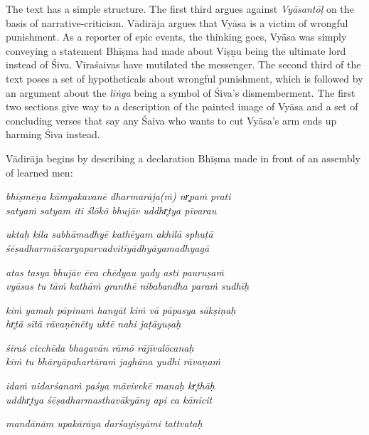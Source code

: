The text has a simple structure. The first third argues against \emph{Vyāsantōḷ} on the basis of narrative-criticism. Vādirāja argues that Vyāsa is a victim of wrongful punishment. As a reporter of epic events, the thinking goes, Vyāsa was simply conveying a statement Bhīṣma had made about Viṣṇu being the ultimate lord instead of Śiva. Vīraśaivas have mutilated the messenger. The second third of the text poses a set of hypotheticals about wrongful punishment, which is followed by an argument about the \emph{liṅga} being a symbol of Śiva’s dismemberment. The first two sections give way to a description of the painted image of Vyāsa and a set of concluding verses that say any Śaiva who wants to cut Vyāsa’s arm ends up harming Śiva instead.


Vādirāja begins by describing a declaration Bhīṣma made in front of an assembly of learned men:

\begin{pullquote}\raggedright
      \emph{bhīṣmēṇa kāmyakavanē dharmarāja(ṁ) nr̥paṁ prati}\\
\emph{satyaṁ satyam iti ślōkō bhujāv uddhr̥tya pīvarau}

\emph{uktaḥ kila sabhāmadhyē kathēyam akhilā sphuṭā}\\
\emph{śēṣadharmāścaryaparvadvitīyādhyāyamadhyagā}

\emph{atas tasya bhujāv ēva chēdyau yady asti pauruṣaṁ}\\
\emph{vyāsas tu tāṁ kathāṁ granthē nibabandha paraṁ sudhīḥ}

\emph{kiṁ yamaḥ pāpinaṁ hanyāt kiṁ vā pāpasya sākṣiṇaḥ}\\
\emph{hr̥tā sītā rāvaṇēnēty uktē nahi jaṭāyuṣaḥ}

\emph{śiraś cicchēda bhagavān rāmō rājīvalōcanaḥ}\\
\emph{kiṁ tu bhāryāpahartāraṁ jaghāna yudhi rāvaṇaṁ}

\emph{idaṁ nidarśanaṁ paśya māvivekē manaḥ kr̥thāḥ}\\
\emph{uddhr̥tya śēṣadharmasthavākyāny api ca kānicit}

\emph{mandānām upakārāya darśayiṣyāmi tattvataḥ}
\end{pullquote}
      
